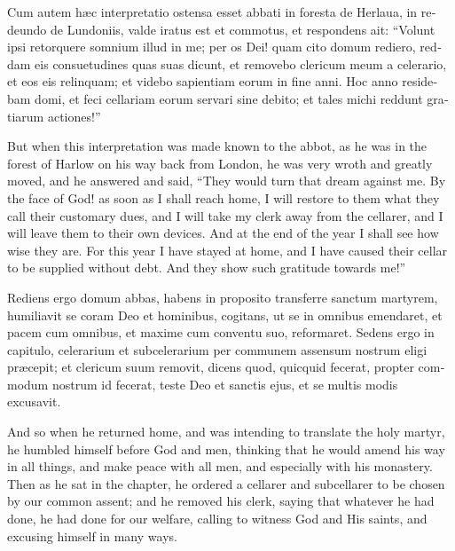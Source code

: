 \documentclass[10pt]{book}
\begin{document}
\begin{paracol}{2}
\switchcolumn*

\begin{otherlanguage}{latin}
Cum autem h\ae{}c interpretatio ostensa esset abbati in foresta de Herlaua, in redeundo de Lundoniis, valde iratus est et commotus, et respondens ait: ``Volunt ipsi retorquere somnium illud in me; per os Dei! quam cito domum rediero, reddam eis consuetudines quas suas dicunt, et removebo clericum meum a celerario, et eos eis relinquam; et videbo sapientiam eorum in fine anni. Hoc anno residebam domi, et feci cellariam eorum servari sine debito; et tales michi reddunt gratiarum actiones!'' 
\end{otherlanguage}

\switchcolumn

But when this interpretation was made known to the abbot, as he was in the forest of Harlow on his way back from London, he was very wroth and greatly moved, and he answered and said, ``They would turn that dream against me. By the face of God! as soon as I shall reach home, I will restore to them what they call their customary dues, and I will take my clerk away from the cellarer, and I will leave them to their own devices. And at the end of the year I shall see how wise they are. For this year I have stayed at home, and I have caused their cellar to be supplied without debt. And they show such gratitude towards me!''

\switchcolumn*

\begin{otherlanguage}{latin}
Rediens ergo domum abbas, habens in proposito transferre sanctum martyrem, humiliavit se coram Deo et hominibus, cogitans, ut se in omnibus emendaret, et pacem cum omnibus, et maxime cum conventu suo, reformaret. Sedens ergo in capitulo, celerarium et subcelerarium per communem assensum nostrum eligi pr\ae{}cepit; et clericum suum removit, dicens quod, quicquid fecerat, propter commodum nostrum id fecerat, teste Deo et sanctis ejus, et se multis modis excusavit.
\end{otherlanguage}

\switchcolumn

And so when he returned home, and was intending to translate the holy martyr, he humbled himself before God and men, thinking that he would amend his way in all things, and make peace with all men, and especially with his monastery. Then as he sat in the chapter, he ordered a cellarer and subcellarer to be chosen by our common assent; and he removed his clerk, saying that whatever he had done, he had done for our welfare, calling to witness God and His saints, and excusing himself in many ways.


\end{paracol}
\end{document}
